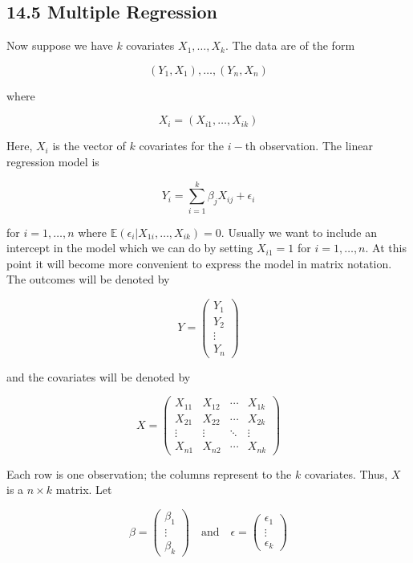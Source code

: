 \subsection*{14.5 Multiple Regression}\label{multiple-regression}

Now suppose we have \(k\) covariates \(X_{1}, \dots, X_{k}\). The data are
of the form

\[(Y_{1}, X_{1}), \dots, (Y_{n}, X_{n})\]

where

\[ X_{i} = (X_{i1}, \dots, X_{ik}) \]

Here, \(X_{i}\) is the vector of \(k\) covariates for the \(i-\)th
observation. The linear regression model is

\[ Y_{i} = \sum_{i=1}^{k} \beta_{j} X_{ij} + \epsilon_{i} \]

for \(i = 1, \dots, n\) where
\(\mathbb{E}(\epsilon_{i} | X_{1i}, \dots, X_{ik}) = 0\). Usually we want
to include an intercept in the model which we can do by setting
\(X_{i1} = 1\) for \(i = 1, \dots, n\). At this point it will become
more convenient to express the model in matrix notation. The outcomes
will be denoted by

\[ Y = \begin{pmatrix}
Y_{1} \\
Y_{2} \\
\vdots \\
Y_{n}
\end{pmatrix}
\]

and the covariates will be denoted by

\[ X = \begin{pmatrix}
X_{11} & X_{12} & \cdots & X_{1k} \\
X_{21} & X_{22} & \cdots & X_{2k} \\
\vdots & \vdots & \ddots & \vdots \\
X_{n1} & X_{n2} & \cdots & X_{nk}
\end{pmatrix}
\]

Each row is one observation; the columns represent to the \(k\)
covariates. Thus, \(X\) is a \(n \times k\) matrix. Let

\[
\beta = \begin{pmatrix}
\beta_{1} \\
\vdots \\
\beta_{k}
\end{pmatrix}
\quad \text{and} \quad
\epsilon = \begin{pmatrix}
\epsilon_{1} \\
\vdots \\
\epsilon_{k}
\end{pmatrix}
\]

